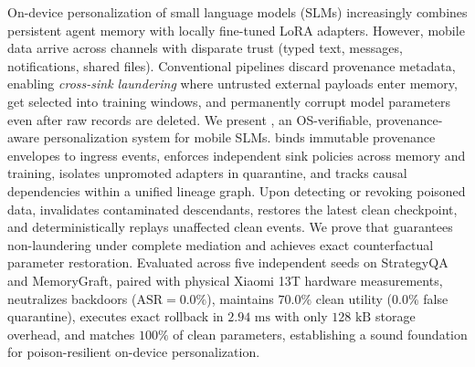 On-device personalization of small language models (SLMs) increasingly combines persistent agent memory with locally fine-tuned LoRA adapters. However, mobile data arrive across channels with disparate trust (typed text, messages, notifications, shared files). Conventional pipelines discard provenance metadata, enabling \emph{cross-sink laundering} where untrusted external payloads enter memory, get selected into training windows, and permanently corrupt model parameters even after raw records are deleted. We present \PG{}, an OS-verifiable, provenance-aware personalization system for mobile SLMs. \PG{} binds immutable provenance envelopes to ingress events, enforces independent sink policies across memory and training, isolates unpromoted adapters in quarantine, and tracks causal dependencies within a unified lineage graph. Upon detecting or revoking poisoned data, \PG{} invalidates contaminated descendants, restores the latest clean checkpoint, and deterministically replays unaffected clean events. We prove that \PG{} guarantees non-laundering under complete mediation and achieves exact counterfactual parameter restoration. Evaluated across five independent seeds on StrategyQA and MemoryGraft, paired with physical Xiaomi 13T hardware measurements, \PG{} neutralizes backdoors ($\mathrm{ASR}=0.0\%$), maintains $70.0\%$ clean utility ($0.0\%$ false quarantine), executes exact rollback in $2.94\text{ ms}$ with only $128\text{ kB}$ storage overhead, and matches $100\%$ of clean parameters, establishing a sound foundation for poison-resilient on-device personalization.
